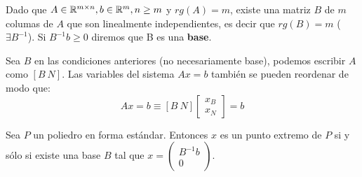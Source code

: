 \documentclass[PM.tex]{subfiles}
\begin{document}
\begin{defi}Dado que $A\in\mathbb{R}^{m\times n}, b\in\mathbb{R}^m, n\geq m$ y $rg(A)=m$, existe una matriz $B$ de $m$ columas de $A$ que son linealmente independientes, es decir que $rg(B)=m$ ($\exists B^{-1}$). Si $B^{-1}b\geq 0$ diremos que B es una \textbf{base}. 
\end{defi}
\begin{obser} Sea $B$ en las condiciones anteriores (no necesariamente base), podemos escribir $A$ como $[B\ N]$. Las variables del sistema $Ax=b$ también se pueden reordenar de modo que:
\[
Ax=b\equiv [B\ N]\begin{bmatrix}
x_B\\
x_N
\end{bmatrix}=b
\]
\end{obser}
\begin{theorem}\label{carac-extremos}
Sea $P$ un poliedro en forma estándar. Entonces $x$ es un punto extremo de $P$ si y sólo si existe una base $B$ tal que $x = \begin{pmatrix} B^{-1}b\\0\end{pmatrix}$.
\end{theorem}
\end{document}
